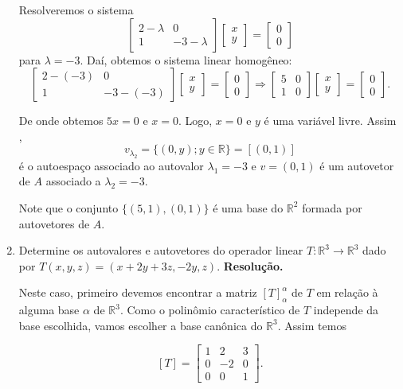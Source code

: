 \begin{enumerate}
 Resolveremos o sistema
$$
 \begin{bmatrix}
2-\lambda & 0\\
 1& -3-\lambda
\end{bmatrix}
 \begin{bmatrix}
x\\
y
\end{bmatrix}=
\begin{bmatrix}
0\\
0
\end{bmatrix}
$$
para $\lambda=-3$. Daí, obtemos o sistema linear homogêneo:
$$
 \begin{bmatrix}
2-(-3) & 0\\
 1& -3-(-3)
\end{bmatrix}
 \begin{bmatrix}
x\\
y
\end{bmatrix}=
\begin{bmatrix}
0\\
0
\end{bmatrix} \Rightarrow
 \begin{bmatrix}
5 & 0\\
 1& 0
\end{bmatrix}
 \begin{bmatrix}
x\\
y
\end{bmatrix}=
\begin{bmatrix}
0\\
0
\end{bmatrix}
.$$

De onde obtemos $5x=0$ e  $x=0$. Logo, $x=0$ e $ y$ é uma variável livre. Assim , $$v_{\lambda_2}=\{ (0, y); y \in \mathbb{R}\}=[(0,1)] $$ é o autoespaço associado ao autovalor $\lambda_1=-3$ e $v=(0,1)$ é um autovetor de $A$ associado a $\lambda_2=-3$.

Note que o conjunto $ \{ (5,1), (0,1)\} $ é uma base do $\mathbb{R}^2$ formada por autovetores de $A$.
\item  Determine os autovalores e autovetores do operador linear $T: \mathbb{R}^3 \rightarrow \mathbb{R}^3$  dado por $T(x,y,z)=(x+2y+3z,-2y, z)$.
\textbf{Resolução.}

Neste caso, primeiro devemos encontrar a matriz  $[T]_{\alpha}^{\alpha}$ de $T$ em relação à alguma base $\alpha$ de $\mathbb{R}^3$. Como o polinômio característico de $T$ independe da base escolhida, vamos escolher a base canônica do $\mathbb{R}^3$.  Assim temos

$$
[T]=
\begin{bmatrix}
1 & 2 & 3\\
0&-2& 0\\
0&0&1
\end{bmatrix}.$$



\end{enumerate}
